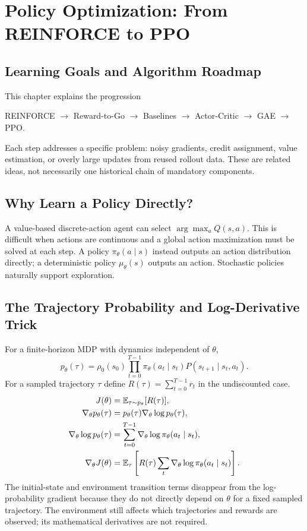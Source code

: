 \chapter{Policy Optimization: From REINFORCE to PPO}
\section{Learning Goals and Algorithm Roadmap}
This chapter explains the progression
\begin{center}
REINFORCE $\rightarrow$ Reward-to-Go $\rightarrow$ Baselines
$\rightarrow$ Actor-Critic $\rightarrow$ GAE $\rightarrow$ PPO.
\end{center}
Each step addresses a specific problem: noisy gradients, credit assignment, value estimation, or overly large updates from reused rollout data. These are related ideas, not necessarily one historical chain of mandatory components.

\section{Why Learn a Policy Directly?}
A value-based discrete-action agent can select $\arg\max_a Q(s,a)$. This is difficult when actions are continuous and a global action maximization must be solved at each step. A policy $\pi_\theta(a\mid s)$ instead outputs an action distribution directly; a deterministic policy $\mu_\theta(s)$ outputs an action. Stochastic policies naturally support exploration.

\section{The Trajectory Probability and Log-Derivative Trick}
For a finite-horizon MDP with dynamics independent of $\theta$,
\begin{equation}
p_\theta(\tau)=\rho_0(s_0)\prod_{t=0}^{T-1}
\pi_\theta(a_t\mid s_t)P(s_{t+1}\mid s_t,a_t).
\end{equation}
For a sampled trajectory $\tau$ define $R(\tau)=\sum_{t=0}^{T-1}r_t$ in the undiscounted case.
\begin{align}
J(\theta)&=\mathbb{E}_{\tau\sim p_\theta}[R(\tau)],\\
\nabla_\theta p_\theta(\tau)&=
p_\theta(\tau)\nabla_\theta\log p_\theta(\tau),\\
\nabla_\theta\log p_\theta(\tau)&=
\sum_{t=0}^{T-1}\nabla_\theta\log\pi_\theta(a_t\mid s_t),\\
\nabla_\theta J(\theta)&=
\mathbb{E}_\tau\left[R(\tau)\sum_t\nabla_\theta\log\pi_\theta(a_t\mid s_t)\right].
\end{align}
The initial-state and environment transition terms disappear from the log-probability gradient because they do not directly depend on $\theta$ for a fixed sampled trajectory. The environment still affects which trajectories and rewards are observed; its mathematical derivatives are not required.

